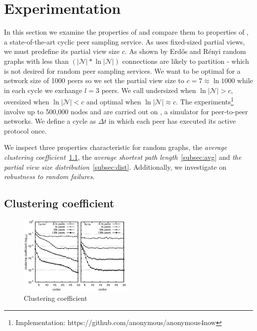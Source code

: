 \section{Experimentation}
\label{sec:experiments}

In this section we examine the properties of \SCAMPLON{} and compare them to
properties of \CYCLON{}, a state-of-the-art cyclic peer sampling service.  As
\CYCLON{} uses fixed-sized partial views, we must predefine its partial view
size $c$.  As shown by Erd{\H o}s and R{\' e}nyi\cite{erdos1959random} random
graphs with less than $(|\mathcal{N}|*\ln|\mathcal{N}|)$ connections are likely
to partition - which is not desired for random peer sampling services.  We want
\CYCLON{} to be optimal for a network size of 1000 peers so we set the partial
view size to $c=7\approx \ln{1000}$ while in each cycle we exchange $l=3$
peers.  We call \CYCLON{} undersized when $\ln{|\mathcal{N}}| > c$, oversized
when $\ln{|\mathcal{N}|} < c$ and optimal when $\ln{|\mathcal{N}|} \approx c$.
The experiments\footnote{Implementation:
  https://github.com/anonymous/anonymous4now} involve up to 500,000 nodes and
are carried out on \PEERSIM{} \cite{peersim}, a simulator for peer-to-peer
networks.  We define a cycle as $\Delta t$ in which each peer has executed its
active protocol once.

We inspect three properties characteristic for random graphs, the \emph{average
  clustering coefficient}~\ref{subsec:cluster}, the \emph{average shortest path
  length}~\ref{subsec:avg} and \emph{the partial view size
  distribution}~\ref{subsec:dist}. Additionally, we investigate on
\emph{robustness to random failures}.

\subsection{Clustering coefficient}
\label{subsec:cluster}

\begin{figure}
  \centering
  \includegraphics[width=0.49\textwidth]{img/cluster.eps}
  \caption{\label{fig:clustering}Clustering coefficient}
\end{figure}

